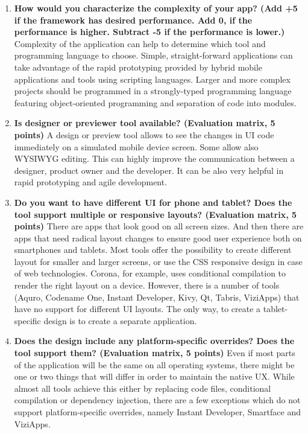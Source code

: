 \documentclass[english,master,public,dept460,male,cpdeclaration,oneside]{diploma}
\begin{document}
\begin{enumerate}
	\item \textbf{How would you characterize the complexity of your app? (Add +5 if the framework has desired performance. Add 0, if the performance is higher. Subtract -5 if the performance is lower.)}
	Complexity of the application can help to determine which tool and programming language to choose. Simple, straight-forward applications can take advantage of the rapid prototyping provided by hybrid mobile applications and tools using scripting languages. Larger and more complex projects should be programmed in a strongly-typed programming language featuring object-oriented programming and separation of code into modules.
	
	\item \textbf{Is designer or previewer tool available? (Evaluation matrix, 5 points) }
	A design or preview tool allows to see the changes in UI code immediately on a simulated mobile device screen. Some allow also WYSIWYG editing. This can highly improve the communication between a designer, product owner and the developer. It can be also very helpful in rapid prototyping and agile development.
	
	\item \textbf{Do you want to have different UI for phone and tablet? Does the tool support multiple or responsive layouts? (Evaluation matrix, 5 points) }
	There are apps that look good on all screen sizes. And then there are apps that need radical layout changes to ensure good user experience both on smartphones and tablets. Most tools offer the possibility to create different layout for smaller and larger screens, or use the CSS responsive design in case of web technologies. Corona, for example, uses conditional compilation to render the right layout on a device. However, there is a number of tools (Aquro, Codename One, Instant Developer, Kivy, Qt, Tabris, ViziApps) that have no support for different UI layouts. The only way, to create a tablet-specific design is to create a separate application.
	
	\item \textbf{Does the design include any platform-specific overrides? Does the tool support them? (Evaluation matrix, 5 points) }
	Even if most parts of the application will be the same on all operating systems, there might be one or two things that will differ in order to maintain the native UX. While almost all tools achieve this either by replacing code files, conditional compilation or dependency injection, there are a few exceptions which do not support platform-specific overrides, namely Instant Developer, Smartface and ViziApps.
	

\end{enumerate}
\end{document}
